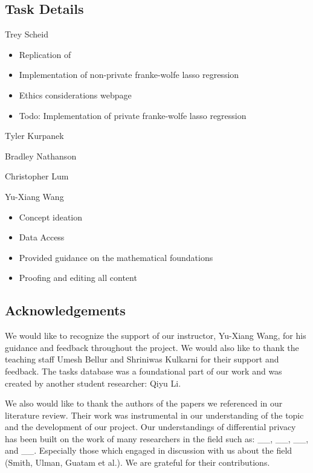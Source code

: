\documentclass[12pt,letterpaper]{article}
\begin{document}
\begin{table}[h]
\subsection{Task Details}

Trey Scheid
\begin{itemize}
    \item Replication of 
    \item Implementation of non-private franke-wolfe lasso regression
    \item Ethics considerations webpage
    \item [ ] Todo: Implementation of private franke-wolfe lasso regression
\end{itemize}

Tyler Kurpanek

Bradley Nathanson

Christopher Lum

Yu-Xiang Wang
\begin{itemize}
  \item Concept ideation
  \item Data Access
  \item Provided guidance on the mathematical foundations
  \item Proofing and editing all content
\end{itemize}


\subsection{Acknowledgements}

We would like to recognize the support of our instructor, Yu-Xiang Wang, for his guidance and feedback throughout the project. We would also like to thank the teaching staff Umesh Bellur and Shriniwas Kulkarni for their support and feedback. The tasks database was a foundational part of our work and was created by another student researcher: Qiyu Li. 

We also would like to thank the authors of the papers we referenced in our literature review. Their work was instrumental in our understanding of the topic and the development of our project. Our understandings of differential privacy has been built on the work of many researchers in the field such as: \_\_, \_\_, \_\_, and \_\_. Especially those which engaged in discussion with us about the field (Smith, Ulman, Guatam et al.). We are grateful for their contributions.



%


\end{table}
\end{document}
